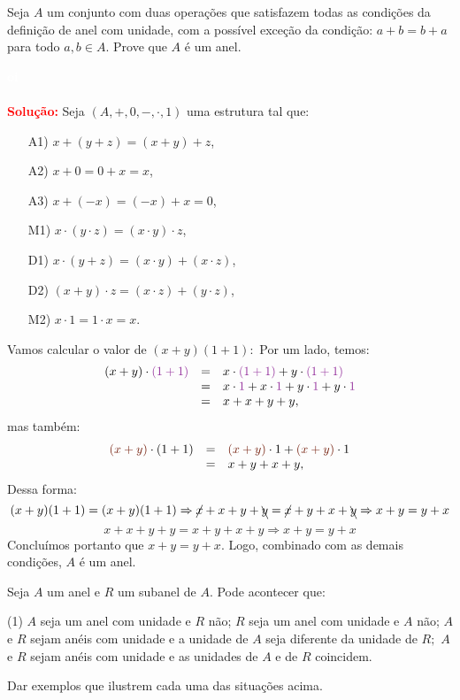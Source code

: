 \documentclass[11pt,a4paper]{article}
\newcounter{exercicio}[section]
\newcommand{\dividiritens}[1]{\begin{tasks}[counter-format={(tsk[a])},label-width=3.6ex, label-format = {\bfseries}, column-sep = {0pt}](1) #1 \end{tasks}}
\newcommand{\pers}[1]{\textcolor{Floresta}{$\negrito{(#1)} $}}
\newcommand{\solucao}[1]{
\textbf{\textcolor{white}{oi}\\ \\ \textcolor{red}{Solução:}} #1}
\begin{document}
 Seja $A$ um conjunto com duas operações que satisfazem todas as condições da definição de anel com
unidade, com a possível exceção da condição: $a + b = b + a$ para todo $a, b \in A.$ Prove que $A$ é um anel.
\solucao{
Seja $(A,+,0,-,\cdot,1)$ uma estrutura tal que:
\begin{itemize}
\item[A1)] $x+(y+z)=(x+y)+z$,
\item[A2)] $x+0=0+x=x$,
\item[A3)] $x+(-x)=(-x)+x=0$,
\item[M1)] $x\cdot(y\cdot z)=(x\cdot y)\cdot z$,
\item[D1)] $x\cdot(y+z)=(x\cdot y)+(x\cdot z)$,
\item[D2)] $(x+y)\cdot z=(x\cdot z)+(y\cdot z)$,
\item[M2)] $x\cdot 1=1\cdot x=x$.
\end{itemize}

Vamos calcular o valor de $(x+y)(1+1):$
Por um lado, temos:
\[
\begin{array}{rcl}
(x+y)\cdot \textcolor{Purple}{(1+1)}&=& x\cdot\textcolor{Purple}{(1+1)}+y\cdot \textcolor{Purple}{(1+1)}\\&=&x\cdot \textcolor{Purple}{1}+x\cdot \textcolor{Purple}{1}+y\cdot \textcolor{Purple}{1}+y\cdot \textcolor{Purple}{1}\\&=&x+x+y+y,
\end{array}
\]
mas também:
\[
\begin{array}{rcl}
\textcolor{Brown}{(x+y)}\cdot(1+1)&=& \textcolor{Brown}{(x+y)}\cdot 1+\textcolor{Brown}{(x+y)}\cdot 1\\&=&x+y+x+y,
\end{array}
\]
Dessa forma:
\[
(x+y)(1+1) = (x+y)(1+1) \Rightarrow \cancel{x} + x + y + \bcancel{y} = \cancel{x} + y + x + \bcancel{y} \Rightarrow x + y = y + x
\]
\[
x+x+y+y=x+y+x+y \Rightarrow \boxed{x+y=y+x}
\]
Concluímos portanto que $x+y=y+x.$ Logo, combinado com as demais condições, $A$ é um anel.


}
Seja $A$ um anel e $R$ um subanel de $A.$ Pode acontecer que:
\dividiritens{
\task[\pers{a}] $A$ seja um anel com unidade e $R$ não;
\task[\pers{b}] $R$ seja um anel com unidade e $A$ não;
\task[\pers{c}] $A$ e $R$ sejam anéis com unidade e a unidade de $A$ seja diferente da unidade de $R;$
\task[\pers{d}] $A$ e $R$ sejam anéis com unidade e as unidades de $A$ e de $R$ coincidem.
}
Dar exemplos que ilustrem cada uma das situações acima.
\end{document}
